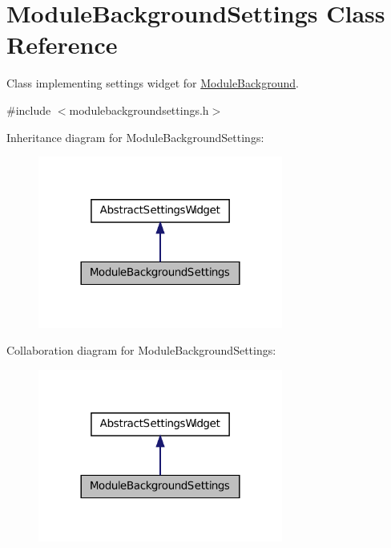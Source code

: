 \hypertarget{class_module_background_settings}{
\section{ModuleBackgroundSettings Class Reference}
\label{d7/deb/class_module_background_settings}
}


Class implementing settings widget for \hyperlink{class_module_background}{ModuleBackground}.  




{\ttfamily \#include $<$modulebackgroundsettings.h$>$}



Inheritance diagram for ModuleBackgroundSettings:
\nopagebreak
\begin{figure}[H]
\begin{center}
\leavevmode
\includegraphics[width=228pt]{d4/df9/class_module_background_settings__inherit__graph}
\end{center}
\end{figure}


Collaboration diagram for ModuleBackgroundSettings:
\nopagebreak
\begin{figure}[H]
\begin{center}
\leavevmode
\includegraphics[width=228pt]{d7/d1d/class_module_background_settings__coll__graph}
\end{center}
\end{figure}
